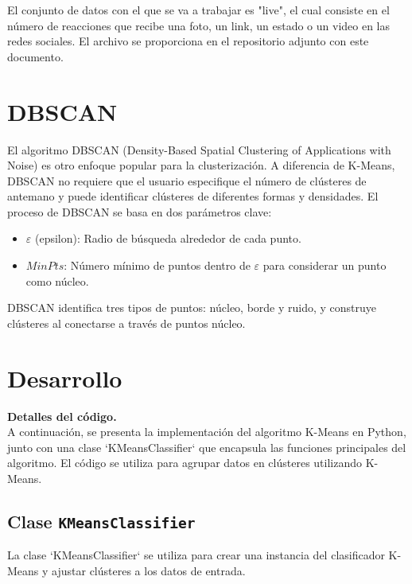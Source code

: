 \documentclass[conference]{IEEEtran}
\begin{document}
El conjunto de datos con el que se va a trabajar es "live", el cual consiste en el número de reacciones que recibe una foto, un link, un estado o un video en las redes sociales. El archivo se proporciona en el repositorio adjunto con este documento.

\section{DBSCAN}

El algoritmo DBSCAN (Density-Based Spatial Clustering of Applications with Noise) es otro enfoque popular para la clusterización. A diferencia de K-Means, DBSCAN no requiere que el usuario especifique el número de clústeres de antemano y puede identificar clústeres de diferentes formas y densidades. El proceso de DBSCAN se basa en dos parámetros clave:

\begin{itemize}
    \item $\varepsilon$ (epsilon): Radio de búsqueda alrededor de cada punto.
    \item $MinPts$: Número mínimo de puntos dentro de $\varepsilon$ para considerar un punto como núcleo.
\end{itemize}

DBSCAN identifica tres tipos de puntos: núcleo, borde y ruido, y construye clústeres al conectarse a través de puntos núcleo.

\section{Desarrollo}

\textbf{Detalles del código.} \\
A continuación, se presenta la implementación del algoritmo K-Means en Python, junto con una clase `KMeansClassifier` que encapsula las funciones principales del algoritmo. El código se utiliza para agrupar datos en clústeres utilizando K-Means.

\subsection{Clase \texttt{KMeansClassifier}}
La clase `KMeansClassifier` se utiliza para crear una instancia del clasificador K-Means y ajustar clústeres a los datos de entrada.
\end{document}

